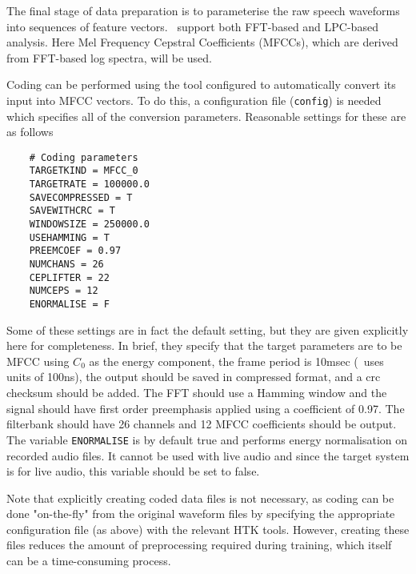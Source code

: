 The final stage of data preparation is to parameterise the raw speech
waveforms into sequences of feature vectors.  \HTK\ support both 
FFT-based
and LPC-based analysis.  
Here Mel Frequency Cepstral Coefficients (MFCCs),
which are derived from FFT-based log spectra, will be used.

Coding can be performed using the tool  
configured to
automatically convert its input into MFCC vectors.  To do this, a configuration
file (\texttt{config}) is needed which specifies all of the conversion 
parameters. 
Reasonable settings for these are as follows
\begin{verbatim}
    # Coding parameters
    TARGETKIND = MFCC_0
    TARGETRATE = 100000.0
    SAVECOMPRESSED = T
    SAVEWITHCRC = T
    WINDOWSIZE = 250000.0
    USEHAMMING = T
    PREEMCOEF = 0.97
    NUMCHANS = 26
    CEPLIFTER = 22
    NUMCEPS = 12
    ENORMALISE = F
\end{verbatim}
Some of these settings are in fact the default setting, but they
are given explicitly here for completeness.  In brief, they specify
that the target parameters are to be MFCC using $C_0$ as the energy
component, the frame period is 10msec (\HTK\ uses units of 100ns),
the output should be saved in compressed format, and a crc checksum should
be added.  The FFT should use a Hamming window and the signal should
have first order preemphasis applied using a coefficient of 0.97.
The filterbank should have 26 channels and 12 MFCC coefficients should
be output. 
The variable \texttt{ENORMALISE} is by default true and performs energy
normalisation on recorded audio files. It cannot be used with live audio and
since the target system is for live audio, this variable should be set to
false.

Note that explicitly creating coded data files is not necessary, as coding can
be done "on-the-fly" from the original waveform files by specifying the
appropriate configuration file (as above) with the relevant HTK tools. However,
creating these files reduces the amount of preprocessing required during
training, which itself can be a time-consuming process.

